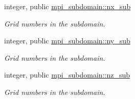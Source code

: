 \begin{DoxyCompactItemize}
\item 
integer, public \mbox{\hyperlink{namespacempi__subdomain_a005fe127fe0fc85b932814a820a36444}{mpi\+\_\+subdomain\+::nx\+\_\+sub}}
\begin{DoxyCompactList}\small\item\em Grid numbers in the subdomain. \end{DoxyCompactList}\item 
integer, public \mbox{\hyperlink{namespacempi__subdomain_a665ba05d0ae9309dd28b9b513a0c87a1}{mpi\+\_\+subdomain\+::ny\+\_\+sub}}
\begin{DoxyCompactList}\small\item\em Grid numbers in the subdomain. \end{DoxyCompactList}\item 
integer, public \mbox{\hyperlink{namespacempi__subdomain_a07555cc931ac78376a4c81207662251f}{mpi\+\_\+subdomain\+::nz\+\_\+sub}}
\begin{DoxyCompactList}\small\item\em Grid numbers in the subdomain. \end{DoxyCompactList}\end{DoxyCompactItemize}

